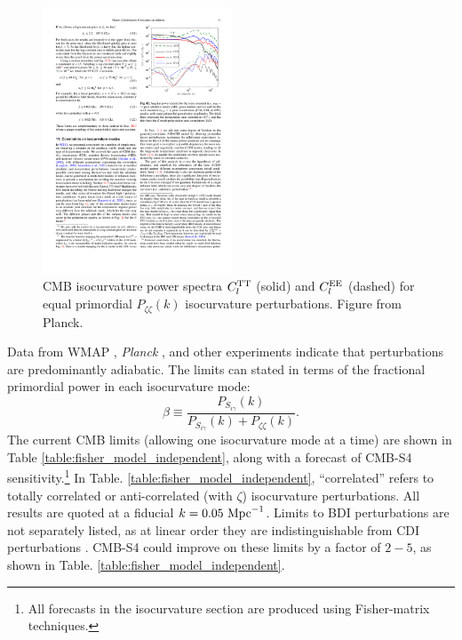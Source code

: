 \begin{figure}[htbp!]
\includegraphics[width=0.5\textwidth, trim={0 10 0 0},clip]{Inflation/iso_schematic.pdf} 
 \caption{CMB isocurvature power spectra $C_{l}^{\rm TT}$ (solid) and $C_{l}^{\rm EE}$ (dashed) for equal primordial $P_{\zeta\zeta}(k)$  isocurvature perturbations. Figure from Planck.
\label{fig:iso_schematic}}
\end{figure} 

Data from WMAP \cite{dunkley09}, \textit{Planck} \cite{Ade:2015lrj}, and other experiments \cite{Enqvist:2000hp,MacTavish:2005yk} indicate that perturbations are predominantly adiabatic. The limits can stated in terms of the fractional primordial power in each isocurvature mode:\begin{equation}
\beta\equiv \frac{P_{S_{i\gamma}}(k)}{P_{S_{i\gamma}}(k)+P_{\zeta\zeta}(k)}.
\end{equation}
The current CMB limits (allowing one isocurvature mode at a time) are shown in Table \ref{table:fisher_model_independent}, along with a forecast of CMB-S4 sensitivity.\footnote{All forecasts in the isocurvature section are produced using Fisher-matrix techniques.} In Table. \ref{table:fisher_model_independent}, ``correlated'' refers to totally correlated or anti-correlated (with $\zeta$) isocurvature perturbations. All results are quoted at a fiducial $k=0.05~{\rm Mpc}^{-1}$. Limits to BDI perturbations are not separately listed, as at linear order they are indistinguishable from CDI perturbations \cite{Gordon:2002gv,Lewis:2002nc,Lewis:2007kz,Gordon:2009wx}. CMB-S4 could improve on these limits by a factor of $2-5$, as shown in Table. \ref{table:fisher_model_independent}.

